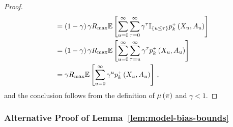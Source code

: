 \begin{proof}
\begin{align*}
        &= \left( 1 - \gamma \right) \gamma R_{\max} \mathbb{E} \left[ \sum_{u=0}^\infty \sum_{\tau=0}^\infty \gamma^\tau \mathbb{I}_{\left\{u \leq \tau\right\}} p_k^{\mathsf{\scriptscriptstyle +}} \left( X_u, A_u \right) \right] \\
        &= \left( 1 - \gamma \right) \gamma R_{\max} \mathbb{E} \left[ \sum_{u=0}^\infty \sum_{\tau=u}^\infty \gamma^\tau p_k^{\mathsf{\scriptscriptstyle +}} \left( X_u, A_u \right) \right] \\
        &= \gamma R_{\max} \mathbb{E} \left[ \sum_{u=0}^\infty \gamma^u p_k^{\mathsf{\scriptscriptstyle +}} \left( X_u, A_u \right) \right]\,,
    \end{align*}
    and the conclusion follows from the definition of $\mu \left( \pi \right)$ and $\gamma < 1$.
\end{proof}


        \subsubsection{Alternative Proof of Lemma~\ref{lem:model-bias-bounds}}

